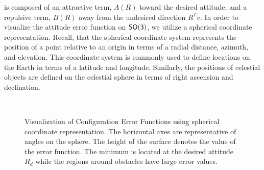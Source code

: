  is composed of an attractive term, \( A (R) \) toward the desired attitude, and a repulsive term, \( B(R) \) away from the undesired direction \( R^T v \).
In order to visualize the attitude error function on \( \mathsf{SO(3)} \), we utilize a spherical coordinate representation.
Recall, that the spherical coordinate system represents the position of a point relative to an origin in terms of a radial distance, azimuth, and elevation.
This coordinate system is commonly used to define locations on the Earth in terms of a latitude and longitude.
Similarly, the positions of celestial objects are defined on the celestial sphere in terms of right ascension and declination. 
\begin{figure}[htbp]%
    \centering 
    ~%

    \caption{Visualization of Configuration Error Functions using spherical coordinate representation. 
    The horizontal axes are representative of angles on the sphere.
    The height of the surface denotes the value of the error function.
    The minimum is located at the desired attitude \( R_d \) while the regions around obstacles have large error values.}
    \label{fig:config_error} 
\end{figure}%
